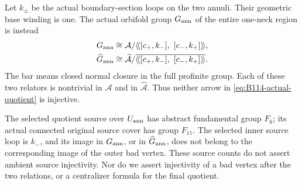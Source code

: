 Let $k_\pm$ be the actual boundary-section loops on the two annuli.
Their geometric base winding is one. The actual orbifold group
$G_{\rm ann}$ of the entire one-neck region is instead
\begin{equation}\label{eq:B114-actual-quotient}
 \begin{split}
 G_{\rm ann}&\cong
 \mathcal A/\langle\!\langle
       [c_+,k_-],\ [c_-,k_+]\rangle\!\rangle,\\
 \widehat G_{\rm ann}&\cong
 \widehat{\mathcal A}/
 \overline{\langle\!\langle[c_+,k_-],\ [c_-,k_+]\rangle\!\rangle}.
 \end{split}
\end{equation}
The bar means closed normal closure in the full profinite group.
Each of these two relators is nontrivial in $\mathcal A$ and in
$\widehat{\mathcal A}$. Thus neither arrow in
\eqref{eq:B114-actual-quotient} is injective.

The selected quotient source over $U_{\rm ann}$ has abstract
fundamental group $F_6$; its actual connected original source cover
has group $F_{11}$. The selected inner source loop is $k_-$, and
its image in $G_{\rm ann}$, or in $\widehat G_{\rm ann}$, does not
belong to the corresponding image of the outer bad vertex.
These source counts do not assert ambient source injectivity.
Nor do we assert injectivity of a bad vertex after the two
relations, or a centralizer formula for the final quotient.

